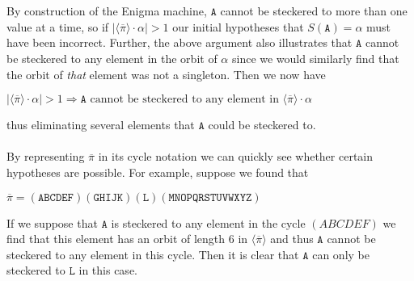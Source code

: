 \\\\By construction of the Enigma machine, $\texttt{A}$ cannot be steckered to
more than one value at a time, so if
$|\langle\overline{\pi}\rangle\cdot\alpha| > 1$ our initial
hypotheses that $S(\texttt{A}) = \alpha$ must have been incorrect. Further,
the above argument also illustrates that $\texttt{A}$ cannot be steckered to
any element in the orbit of $\alpha$ since
we would similarly find that the orbit of \emph{that} element was not a
singleton. Then we now have
\begin{center}
	$|\langle\overline{\pi}\rangle\cdot\alpha| > 1 \Rightarrow \texttt{A} \text{ cannot be steckered to any element in }\langle\overline{\pi}\rangle\cdot\alpha$
\end{center}
thus eliminating several elements that $\texttt{A}$ could be steckered to.
\\\\By representing $\overline\pi$ in its cycle notation we can
quickly see whether certain hypotheses are possible. For example,
suppose we found that
\begin{center}
	$\overline\pi = (\texttt{ABCDEF})(\texttt{GHIJK})(\texttt{L})(\texttt{MNOPQRSTUVWXYZ})$
\end{center}
If we suppose that $\texttt{A}$ is steckered to any element in the cycle
$(ABCDEF)$ we find that this
element has an orbit of length $6$ in $\langle\overline\pi\rangle$
and thus $\texttt{A}$ cannot be steckered
to any element in this cycle. Then it is clear that $\texttt{A}$ can only be
steckered to $\texttt{L}$ in this case.

